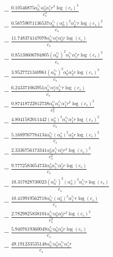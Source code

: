 \documentclass[10pt]{article}
\begin{document}
\begin{align*}
&{}  - \frac{0.10546875 \alpha_{0}^{c_s} \alpha_{0}^s \alpha_{1}^s r^{3} \log{\left(c_{s} \right)}^{3}}{c_{s}^{3}} \\
&{}  - \frac{0.56759071136537 \alpha_{0}^{c_s} \left(\alpha_{0}^s\right)^{2} \alpha_{2}^{c_s} r \log{\left(c_{s} \right)}^{2}}{c_{s}} \\
&{}  - \frac{11.748374147078 \alpha_{0}^{c_s} \alpha_{1}^s \alpha_{2}^s r \log{\left(c_{s} \right)}}{c_{s}} \\
&{}  - \frac{0.85138606704805 \left(\alpha_{0}^{c_s}\right)^{2} \alpha_{1}^{c_s} \alpha_{1}^s r \log{\left(c_{s} \right)}^{2}}{c_{s}} \\
&{}  - \frac{3.9527721340961 \left(\alpha_{0}^{c_s}\right)^{2} \alpha_{0}^s \alpha_{2}^s r \log{\left(c_{s} \right)}^{2}}{c_{s}} \\
&{}  - \frac{6.243371063951 \alpha_{0}^{c_s} \alpha_{1}^s \alpha_{2}^{c_s} r \log{\left(c_{s} \right)}}{c_{s}} \\
&{}  - \frac{0.87418722812738 \alpha_{0}^{c_s} \alpha_{1}^{c_s} \alpha_{1}^s r^{2} \log{\left(c_{s} \right)}^{2}}{c_{s}^{2}} \\
&{}  - \frac{4.8041582011442 \left(\alpha_{0}^s\right)^{2} \alpha_{1}^{c_s} \alpha_{1}^s r \log{\left(c_{s} \right)}^{2}}{c_{s}} \\
&{}  - \frac{5.1689767784134 \alpha_{0}^{c_s} \left(\alpha_{0}^s\right)^{2} \alpha_{2}^s r \log{\left(c_{s} \right)}^{2}}{c_{s}} \\
&{}  - \frac{2.3336756173341 \alpha_{0}^s \alpha_{1}^{c_s} \alpha_{1}^s r^{2} \log{\left(c_{s} \right)}^{2}}{c_{s}^{2}} \\
&{}  - \frac{9.7772583654733 \alpha_{0}^s \alpha_{1}^{c_s} \alpha_{2}^s r \log{\left(c_{s} \right)}}{c_{s}} \\
&{}  - \frac{10.317828730023 \left(\alpha_{0}^{c_s}\right)^{2} \left(\alpha_{0}^s\right)^{2} \alpha_{1}^{c_s} r \log{\left(c_{s} \right)}}{c_{s}} \\
&{}  - \frac{10.419919562718 \alpha_{0}^{c_s} \left(\alpha_{0}^s\right)^{3} \alpha_{1}^{c_s} r \log{\left(c_{s} \right)}}{c_{s}} \\
&{}  - \frac{2.7829825838101 \alpha_{0}^{c_s} \alpha_{0}^s \alpha_{2}^s r^{2} \log{\left(c_{s} \right)}^{2}}{c_{s}^{2}} \\
&{}  - \frac{5.9407619360049 \alpha_{0}^{c_s} \alpha_{0}^s \alpha_{3}^s r \log{\left(c_{s} \right)}}{c_{s}} \\
&{}  - \frac{49.191233535148 \alpha_{0}^{c_s} \alpha_{0}^s \alpha_{1}^{c_s} \alpha_{1}^s r}{c_{s}} \\

\end{align*}
\end{document}
